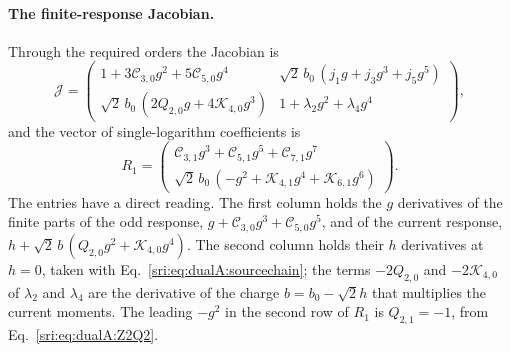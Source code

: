 \paragraph{The finite-response Jacobian.} Through the required orders the Jacobian is
\begin{equation}
 \mathcal J=\begin{pmatrix}
 1+3\mathcal C_{3,0}g^2+5\mathcal C_{5,0}g^4 & \sqrt2\,b_0\,(j_1g+j_3g^3+j_5g^5)\\[2pt]
 \sqrt2\,b_0\,(2Q_{2,0}g+4\mathcal K_{4,0}g^3) & 1+\lambda_2g^2+\lambda_4g^4
 \end{pmatrix},
 \label{sri:eq:dualA:jacobianmatrix}
\end{equation}
and the vector of single-logarithm coefficients is
\begin{equation}
 R_1=\begin{pmatrix}
 \mathcal C_{3,1}g^3+\mathcal C_{5,1}g^5+\mathcal C_{7,1}g^7\\[2pt]
 \sqrt2\,b_0\,(-g^2+\mathcal K_{4,1}g^4+\mathcal K_{6,1}g^6)
 \end{pmatrix}.
 \label{sri:eq:dualA:R1}
\end{equation}
The entries have a direct reading. The first column holds the $g$ derivatives of the finite parts of the odd
response, $g+\mathcal C_{3,0}g^3+\mathcal C_{5,0}g^5$, and of the current response,
$h+\sqrt2\,b\,(Q_{2,0}g^2+\mathcal K_{4,0}g^4)$. The second column holds their $h$ derivatives at $h=0$, taken with
Eq.~\eqref{sri:eq:dualA:sourcechain}; the terms $-2Q_{2,0}$ and $-2\mathcal K_{4,0}$ of $\lambda_2$ and $\lambda_4$ are the
derivative of the charge $b=b_0-\sqrt2h$ that multiplies the current moments. The leading $-g^2$ in the second row of
$R_1$ is $Q_{2,1}=-1$, from Eq.~\eqref{sri:eq:dualA:Z2Q2}.

